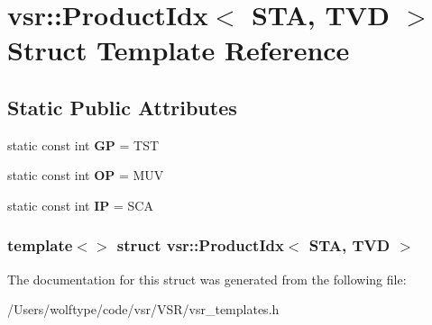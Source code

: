 \hypertarget{structvsr_1_1_product_idx_3_01_s_t_a_00_01_t_v_d_01_4}{\section{vsr\-:\-:Product\-Idx$<$ S\-T\-A, T\-V\-D $>$ Struct Template Reference}
\label{structvsr_1_1_product_idx_3_01_s_t_a_00_01_t_v_d_01_4}
}
\subsection*{Static Public Attributes}
\begin{DoxyCompactItemize}
\item 
\hypertarget{structvsr_1_1_product_idx_3_01_s_t_a_00_01_t_v_d_01_4_ad8633b7104c5fb5d1af7484e241b92dd}{static const int {\bfseries G\-P} = T\-S\-T}\label{structvsr_1_1_product_idx_3_01_s_t_a_00_01_t_v_d_01_4_ad8633b7104c5fb5d1af7484e241b92dd}

\item 
\hypertarget{structvsr_1_1_product_idx_3_01_s_t_a_00_01_t_v_d_01_4_a869aefee7821b57dd90ff82cdcccef5e}{static const int {\bfseries O\-P} = M\-U\-V}\label{structvsr_1_1_product_idx_3_01_s_t_a_00_01_t_v_d_01_4_a869aefee7821b57dd90ff82cdcccef5e}

\item 
\hypertarget{structvsr_1_1_product_idx_3_01_s_t_a_00_01_t_v_d_01_4_a3c88d0858191739dfcad3dd56d35e325}{static const int {\bfseries I\-P} = S\-C\-A}\label{structvsr_1_1_product_idx_3_01_s_t_a_00_01_t_v_d_01_4_a3c88d0858191739dfcad3dd56d35e325}

\end{DoxyCompactItemize}
\subsubsection*{template$<$$>$ struct vsr\-::\-Product\-Idx$<$ S\-T\-A, T\-V\-D $>$}



The documentation for this struct was generated from the following file\-:\begin{DoxyCompactItemize}
\item 
/\-Users/wolftype/code/vsr/\-V\-S\-R/vsr\-\_\-templates.\-h\end{DoxyCompactItemize}

